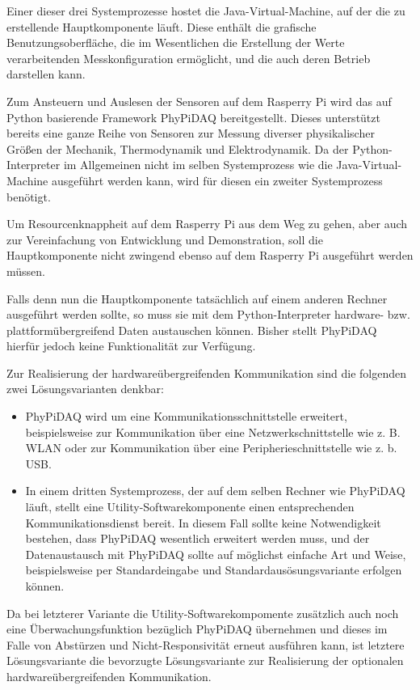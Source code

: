 \documentclass[parskip=full]{scrartcl}
\begin{document}
Einer dieser drei Systemprozesse hostet die Java-Virtual-Machine, auf der die zu erstellende Hauptkomponente läuft. Diese enthält die grafische Benutzungsoberfläche, die im Wesentlichen die Erstellung der Werte verarbeitenden Messkonfiguration ermöglicht, und die auch deren Betrieb darstellen kann. 

Zum Ansteuern und Auslesen der Sensoren auf dem Rasperry Pi wird das auf Python basierende Framework PhyPiDAQ bereitgestellt. Dieses unterstützt bereits eine  ganze Reihe von Sensoren zur Messung diverser physikalischer Größen der Mechanik, Thermodynamik und Elektrodynamik. Da der Python-Interpreter im Allgemeinen nicht im selben Systemprozess wie die Java-Virtual-Machine ausgeführt werden kann, wird für diesen ein zweiter Systemprozess benötigt.

Um Resourcenknappheit auf dem Rasperry Pi aus dem Weg zu gehen, aber auch zur Vereinfachung von Entwicklung und Demonstration, soll die Hauptkomponente nicht zwingend ebenso auf dem Rasperry Pi ausgeführt werden müssen. 

Falls denn nun die Hauptkomponente tatsächlich auf einem anderen Rechner ausgeführt werden sollte, so muss sie mit dem Python-Interpreter hardware- bzw. plattformübergreifend Daten austauschen können. Bisher stellt PhyPiDAQ hierfür jedoch keine Funktionalität zur Verfügung.

Zur Realisierung der hardwareübergreifenden Kommunikation sind die folgenden zwei Lösungsvarianten denkbar: 

\begin{itemize}


	\item PhyPiDAQ wird um eine Kommunikationsschnittstelle erweitert, beispielsweise zur Kommunikation über eine Netzwerkschnittstelle wie z. B. WLAN oder zur Kommunikation über eine Peripherieschnittstelle wie z. b. USB.
	
	\item In einem dritten Systemprozess, der auf dem selben Rechner wie PhyPiDAQ läuft, stellt eine Utility-Softwarekomponente einen entsprechenden Kommunikationsdienst bereit. In diesem Fall sollte keine Notwendigkeit bestehen, dass PhyPiDAQ wesentlich erweitert werden muss, und der Datenaustausch mit PhyPiDAQ sollte auf möglichst einfache Art und Weise, beispielsweise per Standardeingabe und Standardausösungsvariante erfolgen können.

\end{itemize}

Da bei letzterer Variante die Utility-Softwarekompomente zusätzlich auch noch eine Überwachungsfunktion bezüglich PhyPiDAQ übernehmen und dieses im Falle von Abstürzen und Nicht-Responsivität erneut ausführen kann, ist letztere Lösungsvariante die bevorzugte Lösungsvariante zur Realisierung der optionalen hardwareübergreifenden Kommunikation. 
\end{document}
